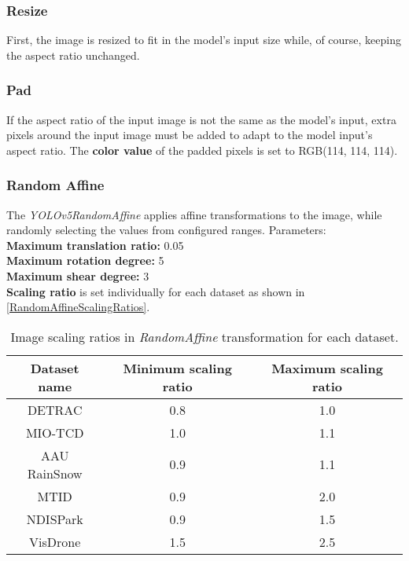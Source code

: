
\subsubsection*{Resize}

First, the image is resized to fit in the model's input size while, of course,
keeping the aspect ratio unchanged.

\subsubsection*{Pad}

\label{PadTransformation}
If the aspect ratio of the input image is not the same as the model's input, extra pixels around the input image must be added
to adapt to the model input's aspect ratio. The \textbf{color value} of the padded pixels is set to RGB(114, 114, 114).

\subsubsection*{Random Affine}

The \textit{YOLOv5RandomAffine} applies affine transformations to the image,
while randomly selecting the values from configured ranges. Parameters:\\
\textbf{Maximum translation ratio:} 0.05 \\
\textbf{Maximum rotation degree:} 5 \\
\textbf{Maximum shear degree:} 3 \\
\textbf{Scaling ratio} is set individually for each dataset as shown in \autoref{RandomAffineScalingRatios}.

\begin{table}[h]
\centering
\label{RandomAffineScalingRatios}
\begin{tabular}{|c|c|c|}
    \hline
    Dataset name & Minimum scaling ratio & Maximum scaling ratio \\
    \hline
    DETRAC       & 0.8 & 1.0 \\
    MIO-TCD      & 1.0 & 1.1 \\
    AAU RainSnow & 0.9 & 1.1 \\
    MTID         & 0.9 & 2.0 \\
    NDISPark     & 0.9 & 1.5 \\
    VisDrone     & 1.5 & 2.5 \\
    \hline
\end{tabular}
\caption{Image scaling ratios in \textit{RandomAffine} transformation for each dataset.}
\end{table}

